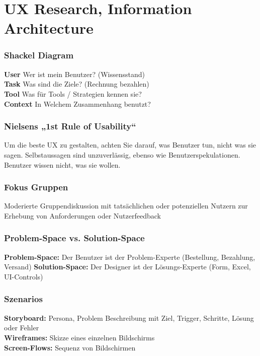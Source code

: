 
\section{UX Research, Information Architecture}

\subsubsection{Shackel Diagram}
\textbf{User} Wer ist mein Benutzer? (Wissensstand)\\
\textbf{Task} Was sind die Ziele? (Rechnung bezahlen)\\
\textbf{Tool} Was für Tools / Strategien kennen sie?\\
\textbf{Context} In Welchem Zusammenhang benutzt?

\subsubsection{Nielsens „1st Rule of Usability“}
Um die beste UX zu gestalten, achten Sie darauf, was Benutzer tun, nicht was sie sagen. Selbstaussagen sind unzuverlässig, ebenso wie Benutzerspekulationen. Benutzer wissen nicht, was sie wollen.

\subsubsection{Fokus Gruppen}
Moderierte Gruppendiskussion mit tatsächlichen oder potenziellen Nutzern zur Erhebung von Anforderungen oder Nutzerfeedback


\subsubsection{Problem-Space vs. Solution-Space}
\textbf{Problem-Space:} Der Benutzer ist der Problem-Experte (Bestellung, Bezahlung, Versand)
\textbf{Solution-Space:} Der Designer ist der Lösungs-Experte (Form, Excel, UI-Controls)


\subsubsection{Szenarios}
\textbf{Storyboard:} Persona, Problem Beschreibung mit Ziel, Trigger, Schritte, Lösung oder Fehler\\
\textbf{Wireframes:} Skizze eines einzelnen Bildschirms\\
\textbf{Screen-Flows:} Sequenz von Bildschirmen

